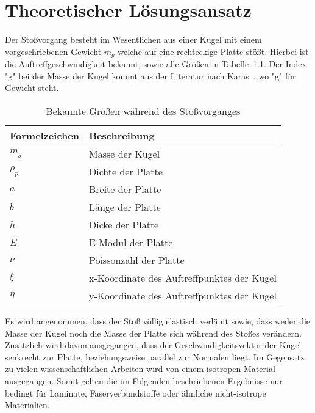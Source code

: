 \chapter{Theoretischer Lösungsansatz}
\label{chap:Principles}

Der Stoßvorgang besteht im Wesentlichen aus einer Kugel mit einem vorgeschriebenen Gewicht $m_g$ welche auf eine rechteckige Platte stößt. Hierbei ist die Auftreffgeschwindigkeit bekannt, sowie alle Größen in Tabelle~\ref{tab:TheorieVariablen}. Der Index "g" bei der Masse der Kugel kommt aus der Literatur nach Karas~\cite{Karas.1939}, wo "g" für Gewicht steht. 

\begin{table}[h!]
	\begin{center}
		\caption{Bekannte Größen während des Stoßvorganges}
		\label{tab:TheorieVariablen}
		
		\begin{tabular}[h]{l | l}	
			Formelzeichen & Beschreibung \\
			\hline
			$m_g$ & Masse der Kugel \\
			$\rho_p$ & Dichte der Platte\\
			$a$ & Breite der Platte\\
			$b$ & Länge der Platte\\
			$h$ & Dicke der Platte \\
			$E$ & E-Modul der Platte \\
			$\nu$ & Poissonzahl der Platte \\
			$\xi$ & x-Koordinate des Auftreffpunktes der Kugel \\
			$\eta$ & y-Koordinate des Auftreffpunktes der Kugel \\
		\end{tabular}
		
	\end{center}
\end{table}


Es wird angenommen, dass der Stoß völlig elastisch verläuft sowie, dass weder die Masse der Kugel noch die Masse der Platte sich während des Stoßes verändern.
Zusätzlich wird davon ausgegangen, dass der Geschwindigkeitsvektor der Kugel senkrecht zur Platte, beziehungsweise  parallel zur Normalen liegt. Im Gegensatz zu vielen wissenschaftlichen Arbeiten wird von einem isotropen Material ausgegangen. Somit gelten die im Folgenden beschriebenen Ergebnisse nur bedingt für Laminate, Faserverbundstoffe oder ähnliche nicht-isotrope Materialien. 

